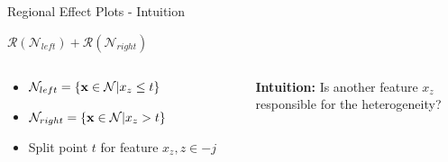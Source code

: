 \documentclass[11pt,compress,t,notes=noshow, aspectratio=169, xcolor=table]{beamer}
\begin{document}
\begin{frame}{Regional Effect Plots - Intuition}
\begin{itemize}
\medskip

\centerline{$\mathcal{R}\left(\mathcal{N}_{left}\right) + \mathcal{R}\left(\mathcal{N}_{right}\right)$}
\end{itemize}

      \begin{columns}[c, totalwidth=\textwidth]
        \begin{column}{0.4\textwidth}
    \begin{itemize}
        \item $\mathcal{N}_{left} = \{\mathbf{x} \in \mathcal{N}|x_z \leq t\}$
        \item $\mathcal{N}_{right} = \{\mathbf{x} \in \mathcal{N}|x_z > t\}$
        \item Split point $t$ for feature $x_z, z \in -j$
    \end{itemize}
        \end{column}
          \begin{column}{0.59\textwidth}
          \centering
          \textbf{Intuition:} Is another feature $x_z$ \\responsible for the heterogeneity?
        \end{column}
    \end{columns}
\end{frame}
\end{document}
